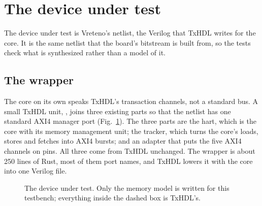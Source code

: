 \section{The device under test}
\label{sec:dut}

The device under test is Vreteno's netlist, the Verilog that TxHDL
writes for the core. It is the same netlist that the board's
bitstream is built from, so the tests check what is synthesized rather
than a model of it.

\subsection{The wrapper}

The core on its own speaks TxHDL's transaction channels, not a standard
bus. A small TxHDL unit, , joins three existing parts so that
the netlist has one standard AXI4 manager port (Fig.~\ref{fig:dut}).
The three parts are the hart, which is the core with its memory
management unit; the tracker, which turns the core's loads, stores and
fetches into AXI4 bursts; and an adapter that puts the five AXI4
channels on pins. All three come from TxHDL unchanged. The wrapper is
about 250 lines of Rust, most of them port names, and TxHDL lowers it
with the core into one Verilog file.

\begin{figure}[t]
\centering
{}
\caption{The device under test. Only the memory model is written for
this testbench; everything inside the dashed box is TxHDL's.}
\label{fig:dut}
\end{figure}

